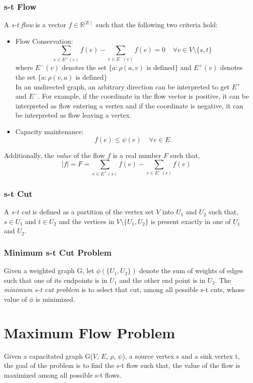 \documentclass[BTech]{iitmdiss}
\begin{document}
      \subsubsection{s-t Flow}
	A \textit{s-t flow} is a vector $f \in \mathbb{R}^{\mid E \mid}$ such that the following two criteria hold:
	\begin{itemize}
	 \item 
	   Flow Conservation: $$\displaystyle\sum_{e \in E^+(v)} f(e)- \displaystyle\sum_{e \in E^-(v)} f(e) = 0 ~~~~~ \forall v \in V \setminus \{s,t\}$$
	   where $E^-(v)$ denotes the set $\{a: \rho(a,v) \text{ is defined}\}$ and $E^+(v)$ denotes the set $\{a: \rho(v,a) \text{ is defined}\}$ \\
	   
	   In an undirected graph, an arbitrary direction can be interpreted to get $E^+$ and $E^-$. For example, if the coordinate in the flow vector is
	   positive, it can be interpreted as flow entering a vertex and if the coordinate is negative, it can be interpreted as flow leaving a vertex.
	   
	 \item
	  Capacity maintenance:
	    $$f(e) \leq \psi(e)~~~~~\forall e \in E$$
	      
	\end{itemize}
	
	Additionally, the \textit{value} of the flow $f$ is a real number $F$ such that,
	$$\mid f\mid  = F = \displaystyle\sum_{e \in E^+(s)} f(e)- \displaystyle\sum_{e \in E^-(s)} f(e)$$
	
      \subsubsection{s-t Cut}
	A \textit{s-t cut} is defined as a partition of the vertex set $V$ into $U_1$ and $U_2$ such that, $s \in U_1$ and $t \in U_2$ and the vertices
	in $V \setminus \{U_1, U_2 \}$ is present exactly in one of $U_1$ and $U_2$.
      
      \subsubsection{Minimum s-t Cut Problem}
	Given a weighted graph G, let $\phi(\{U_1,U_2\})$ denote the sum of weights of edges such that one of its endpoints is in $U_1$ and the other
	end point is in $U_2$. The \textit{minimum s-t cut problem} is to select that cut, among all possible s-t cuts, whose value of $\phi$ is minimized.
      \section{Maximum Flow Problem}
	Given a capacitated graph G($V$, $E$, $\rho$, $\psi$), a source vertex s and a sink vertex t, the goal of the problem is to find the s-t flow
	such that, the value of the flow is maximized among all possible s-t flows. \\
	
\end{document}
